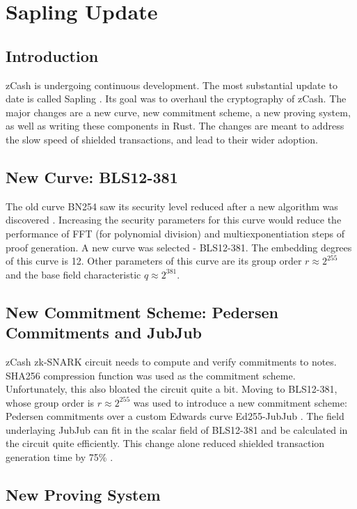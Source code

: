 \section{Sapling Update}

\subsection{Introduction}
zCash is undergoing continuous development. The most substantial update to date is called Sapling \cite{zcashsapling}. Its goal was to overhaul the cryptography of zCash. The major changes are a new curve, new commitment scheme, a new proving system, as well as writing these components in Rust. The changes are meant to address the slow speed of shielded transactions, and lead to their wider adoption.

\subsection{New Curve: BLS12-381}

The old curve BN254 saw its security level reduced after a new algorithm was discovered \cite{zcashbls12381}. Increasing the security parameters for this curve would reduce the performance of FFT (for polynomial division) and multiexponentiation steps of proof generation. A new curve was selected - BLS12-381. The embedding degrees of this curve is 12. Other parameters of this curve are its group order $r \approx 2^{255}$ and the base field characteristic $q \approx 2^{381}$.

\subsection{New Commitment Scheme: Pedersen Commitments and JubJub}

zCash zk-SNARK circuit needs to compute and verify commitments to notes. SHA256 compression function was used as the commitment scheme. Unfortunately, this also bloated the circuit quite a bit. Moving to BLS12-381, whose group order is $r \approx 2^{255}$ was used to introduce a new commitment scheme: Pedersen commitments over a custom Edwards curve Ed255-JubJub \cite{zcashjubjub}. The field underlaying JubJub can fit in the scalar field of BLS12-381 and be calculated in the circuit quite efficiently. This change alone reduced shielded transaction generation time by 75\% \cite{zcashreducing}.

\subsection{New Proving System}
\label{grothexpl}

